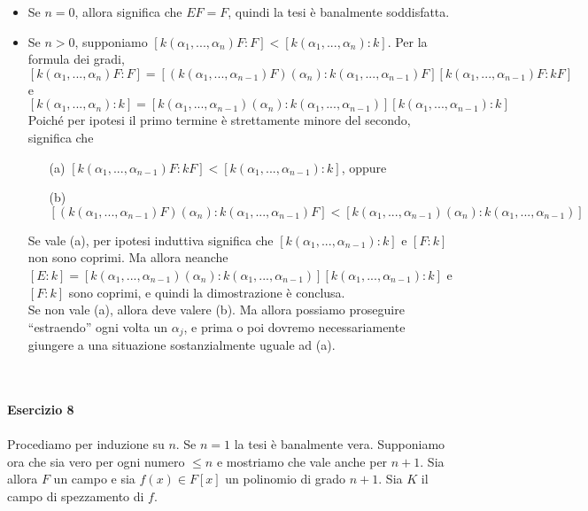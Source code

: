 \documentclass[12pt,a4paper]{report}
\theoremstyle{definition}
\begin{document}
\begin{itemize}
\item Se $n=0$, allora significa che $EF=F$, quindi la tesi è banalmente soddisfatta.
\item Se $n>0$, supponiamo $[k(\alpha_1,...,\alpha_n)F:F] < [k(\alpha_1,...,\alpha_n):k]$. Per la formula dei gradi,
$$[k(\alpha_1,...,\alpha_n)F:F]=[(k(\alpha_1,...,\alpha_{n-1})F)(\alpha_n):k(\alpha_1,...,\alpha_{n-1})F][k(\alpha_1,...,\alpha_{n-1})F:kF]$$
e
$$[k(\alpha_1,...,\alpha_n):k]=[k(\alpha_1,...,\alpha_{n-1})(\alpha_n):k(\alpha_1,...,\alpha_{n-1})][k(\alpha_1,...,\alpha_{n-1}):k]$$
Poiché per ipotesi il primo termine è strettamente minore del secondo, significa che
\begin{itemize}
\item[(a)] $[k(\alpha_1,...,\alpha_{n-1})F:kF] < [k(\alpha_1,...,\alpha_{n-1}):k]$, oppure
\item[(b)] $[(k(\alpha_1,...,\alpha_{n-1})F)(\alpha_n):k(\alpha_1,...,\alpha_{n-1})F] < [k(\alpha_1,...,\alpha_{n-1})(\alpha_n):k(\alpha_1,...,\alpha_{n-1})]$
\end{itemize}

Se vale (a), per ipotesi induttiva significa che $[k(\alpha_1,...,\alpha_{n-1}):k]$ e $[F:k]$ non sono coprimi. Ma allora neanche $[E:k]=[k(\alpha_1,...,\alpha_{n-1})(\alpha_n):k(\alpha_1,...,\alpha_{n-1})][k(\alpha_1,...,\alpha_{n-1}):k]$ e $[F:k]$ sono coprimi, e quindi la dimostrazione è conclusa.\\
Se non vale (a), allora deve valere (b). Ma allora possiamo proseguire ``estraendo'' ogni volta un $\alpha_j$, e prima o poi dovremo necessariamente giungere a una situazione sostanzialmente uguale ad (a).
\end{itemize}\ 
\\
\\
\noindent\textbf{Esercizio 8}\\
\\
Procediamo per induzione su $n$. Se $n=1$ la tesi è banalmente vera. Supponiamo ora che sia vero per ogni numero $\leq n$ e mostriamo che vale anche per $n+1$. Sia allora $F$ un campo e sia $f(x) \in F[x]$ un polinomio di grado $n+1$. Sia $K$ il campo di spezzamento di $f$. 
\end{document}
